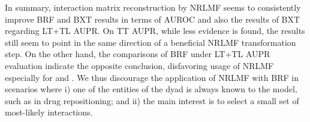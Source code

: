 





In summary, interaction matrix reconstruction by NRLMF seems to consistently improve BRF and BXT results in terms of AUROC and also the results of BXT regarding LT+TL AUPR. On TT AUPR, while less evidence is found, the results still seem to point in the same direction of a beneficial NRLMF transformation step. On the other hand, the comparisons of BRF under LT+TL AUPR evaluation indicate the opposite conclusion, disfavoring usage of NRLMF especially for  and . We thus discourage the application of NRLMF with BRF in scenarios where i) one of the entities of the dyad is always known to the model, such as in drug repositioning; and ii) the main interest is to select a small set of most-likely interactions.


% 


